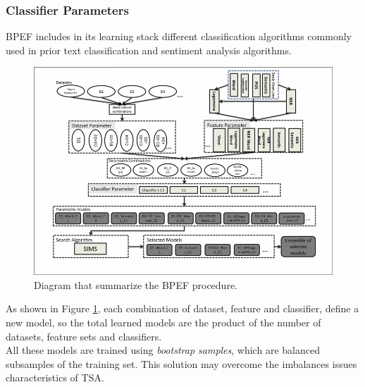 \subsubsection{Classifier Parameters}

BPEF includes in its learning stack different classification algorithms commonly used in prior text classification and sentiment analysis algorithms. \\

\begin{figure}[ht]
	\centering
	\includegraphics[width=1\textwidth]{figures/bpef.png}
	\caption{Diagram that summarize the BPEF procedure.}
	\label{fig:bpef}
\end{figure}

 As shown in Figure \ref{fig:bpef}, each combination of dataset, feature and classifier, define a new model, so the total learned models are the product of the number of datasets, feature sets and classifiers.\\
 All these models are trained using \textit{bootstrap samples}, which are balanced subsamples of the training set. This solution may overcome the imbalances issues characteristics of TSA.
 
 
